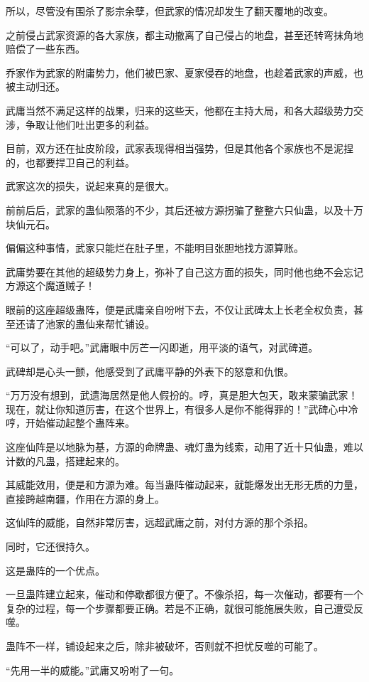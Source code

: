 \begin{this_body}
所以，尽管没有围杀了影宗余孽，但武家的情况却发生了翻天覆地的改变。

之前侵占武家资源的各大家族，都主动撤离了自己侵占的地盘，甚至还转弯抹角地赔偿了一些东西。

乔家作为武家的附庸势力，他们被巴家、夏家侵吞的地盘，也趁着武家的声威，也被主动归还。

武庸当然不满足这样的战果，归来的这些天，他都在主持大局，和各大超级势力交涉，争取让他们吐出更多的利益。

目前，双方还在扯皮阶段，武家表现得相当强势，但是其他各个家族也不是泥捏的，也都要捍卫自己的利益。

武家这次的损失，说起来真的是很大。

前前后后，武家的蛊仙陨落的不少，其后还被方源拐骗了整整六只仙蛊，以及十万块仙元石。

偏偏这种事情，武家只能烂在肚子里，不能明目张胆地找方源算账。

武庸势要在其他的超级势力身上，弥补了自己这方面的损失，同时他也绝不会忘记方源这个魔道贼子！

眼前的这座超级蛊阵，便是武庸亲自吩咐下去，不仅让武碑太上长老全权负责，甚至还请了池家的蛊仙来帮忙铺设。

“可以了，动手吧。”武庸眼中厉芒一闪即逝，用平淡的语气，对武碑道。

武碑却是心头一颤，他感受到了武庸平静的外表下的怒意和仇恨。

“万万没有想到，武遗海居然是他人假扮的。哼，真是胆大包天，敢来蒙骗武家！现在，就让你知道厉害，在这个世界上，有很多人是你不能得罪的！”武碑心中冷哼，开始催动起整个蛊阵来。

这座仙阵是以地脉为基，方源的命牌蛊、魂灯蛊为线索，动用了近十只仙蛊，难以计数的凡蛊，搭建起来的。

其威能效用，便是和方源为难。每当蛊阵催动起来，就能爆发出无形无质的力量，直接跨越南疆，作用在方源的身上。

这仙阵的威能，自然非常厉害，远超武庸之前，对付方源的那个杀招。

同时，它还很持久。

这是蛊阵的一个优点。

一旦蛊阵建立起来，催动和停歇都很方便了。不像杀招，每一次催动，都要有一个复杂的过程，每一个步骤都要正确。若是不正确，就很可能施展失败，自己遭受反噬。

蛊阵不一样，铺设起来之后，除非被破坏，否则就不担忧反噬的可能了。

“先用一半的威能。”武庸又吩咐了一句。


\end{this_body}
